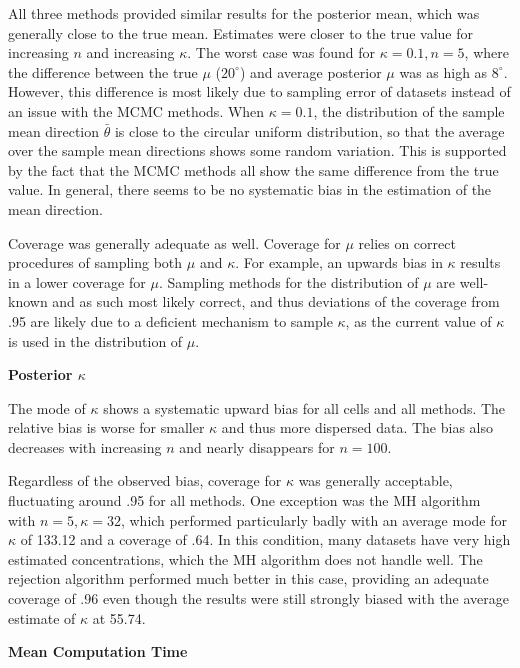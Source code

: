 \documentclass[bib]{ba/ba}
\begin{document}
All three methods provided similar results for the posterior mean, which was generally close to the true mean. Estimates were closer to the true value for increasing $n$ and increasing $\kappa$. The worst case was found for $\kappa=0.1, n=5$, where the difference between the true $\mu$ ($20^\circ$) and average posterior $\mu$ was as high as $8^\circ$. However, this difference is most likely due to sampling error of datasets instead of an issue with the MCMC methods. When $\kappa=0.1$, the distribution of the sample mean direction $\bar{\theta}$ is close to the circular uniform distribution, so that the average over the sample mean directions shows some random variation. This is supported by the fact that the MCMC methods all show the same difference from the true value. In general, there seems to be no systematic bias in the estimation of the mean direction. 

Coverage was generally adequate as well. Coverage for $\mu$ relies on correct procedures of sampling both $\mu$ and $\kappa$. For example, an upwards bias in $\kappa$ results in a lower coverage for $\mu$. Sampling methods for the distribution of $\mu$ are well-known and as such most likely correct, and thus deviations of the coverage from .95 are likely due to a deficient mechanism to sample $\kappa$, as the current value of $\kappa$ is used in the distribution of $\mu$.



\vspace{0.3cm}
\noindent \textbf{Posterior $\kappa$}

The mode of $\kappa$ shows a systematic upward bias for all cells and all methods. The relative bias is worse for smaller $\kappa$ and thus more dispersed data. The bias also decreases with increasing $n$ and nearly disappears for $n = 100$. 

Regardless of the observed bias, coverage for $\kappa$ was generally acceptable, fluctuating around .95 for all methods. One exception was the MH algorithm with $n=5, \kappa=32$, which performed particularly badly with an average mode for $\kappa$ of 133.12 and a coverage of .64. In this condition, many datasets have very high estimated concentrations, which the MH algorithm does not handle well. The rejection algorithm performed much better in this case, providing an adequate coverage of .96 even though the results were still strongly biased with the average estimate of $\kappa$ at 55.74. 

\vspace{0.9cm}
\noindent \textbf{Mean Computation Time}
\end{document}
